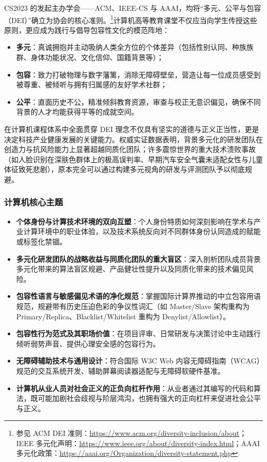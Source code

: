 CS2023 的发起主办学会——ACM、IEEE-CS 与 AAAI，均将“多元、公平与包容（DEI）”确立为协会的核心准则。\footnote{参见 ACM DEI 准则：\url{https://www.acm.org/diversity-inclusion/about}；IEEE 多元化声明：\url{https://www.ieee.org/about/diversity-index.html}；AAAI 多元化政策：\url{https://aaai.org/Organization/diversity-statement.php}}计算机高等教育课堂不仅应当向学生传授这些原则，更应成为践行与倡导包容性文化的模范阵地：
\begin{itemize}
    \item \textbf{多元}：真诚拥抱并主动吸纳人类全方位的个体差异（包括性别认同、种族族群、身体功能状况、文化信仰、国籍背景等）；
    \item \textbf{包容}：致力打破物理与数字藩篱，消除无障碍壁垒，营造让每一位成员感受到被尊重、被倾听与拥有归属感的友好学术社群；
    \item \textbf{公平}：直面历史不公，精准倾斜教育资源，审查与校正无意识偏见，确保不同背景的人才均能获得平等的成就空间。
\end{itemize}
在计算机课程体系中全面贯穿 DEI 理念不仅具有坚实的道德与正义正当性，更是决定科技产业健康发展的关键能力。权威实证数据表明，背景多元化的研发团队在创造力与抗风险能力上显著超越同质化团队；许多震惊世界的重大技术溃败事故（如人脸识别在深肤色群体上的极高误判率、早期汽车安全气囊未适配女性与儿童体征致死悲剧），原本完全可以通过构建多元视角的研发与评测团队予以彻底规避。

\subsubsection{计算机核心主题}
\begin{itemize}
    \item \textbf{个体身份与计算技术环境的双向互塑}：个人身份特质如何深刻影响在学术与产业计算环境中的职业体验，以及技术系统反向对不同群体身份认同造成的赋能或标签化禁锢。
    \item \textbf{多元化研发团队的战略收益与同质化团队的重大盲区}：深入剖析团队成员背景多元化带来的算法盲区规避、产品健壮性提升以及同质化带来的技术偏见风险。
    \item \textbf{包容性语言与敏感偏见术语的净化规范}：掌握国际计算界推动的中立包容用语规范，规避带有历史压迫色彩的争议性词汇（如 Master/Slave 架构重构为 Primary/Replica、Blacklist/Whitelist 重构为 Denylist/Allowlist）。
    \item \textbf{包容性行为范式及其职场价值}：在项目评审、日常研发与决策讨论中主动践行倾听弱势声音、提供心理安全感的包容行为。
    \item \textbf{无障碍辅助技术与通用设计}：符合国际 W3C Web 内容无障碍指南（WCAG）规范的交互系统开发、辅助屏幕阅读器适配与无障碍软硬件基准。
    \item \textbf{计算机从业人员对社会正义的正负向杠杆作用}：从业者通过其编写的代码和算法，既可能加剧社会歧视与阶层鸿沟，也拥有强大的正向杠杆来促进社会公平与正义。
\end{itemize}

